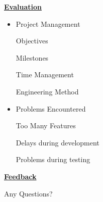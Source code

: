 \documentclass[a4,12pt]{seminar}
\newcommand{\SlideTitle}[1]{\Large \underline{\textbf{#1}}\normalsize}
\begin{document}
\begin{slide}{\SlideTitle{Evaluation}}

\begin{itemize}

\item Project Management

\subitem Objectives

\subitem Milestones

\subitem Time Management

\subitem Engineering Method

\item Problems Encountered

\subitem Too Many Features

\subitem Delays during development

\subitem Problems during testing

\end{itemize}

\vspace{25mm}

\end{slide}


\begin{slide}{\SlideTitle{Feedback}}

\vspace{25mm}

\begin{center}
Any Questions?
\end{center}

\vspace{25mm}

\end{slide}
\end{document}
